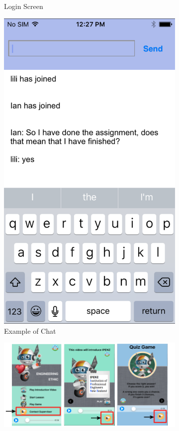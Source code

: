 \begin{figure}[H]
\begin{subfigure}{0.27\textwidth}
\caption{Login Screen}
    \end{subfigure}\hspace{0.02\textwidth}
 \begin{subfigure}{0.27\textwidth}
\includegraphics[width=\textwidth]{chat2}
\caption{Example of Chat}
 \end{subfigure}\hspace{0.5\textwidth}
 \begin{subfigure}{0.8\textwidth}
\includegraphics[width=\textwidth]{chat3}

\end{subfigure}
\end{figure}
